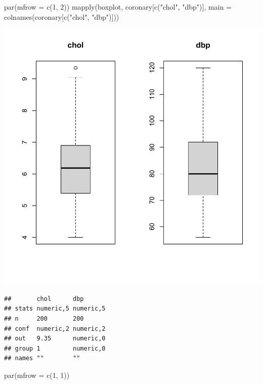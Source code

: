\documentclass[
]{book}
\makeatletter
\newenvironment{Shaded}{\begin{snugshade}}{\end{snugshade}}
\newcommand{\AttributeTok}[1]{\textcolor[rgb]{0.61,0.61,0.61}{#1}}
\newcommand{\DecValTok}[1]{\textcolor[rgb]{0.06,0.06,0.06}{#1}}
\newcommand{\FunctionTok}[1]{\textcolor[rgb]{0,0,0}{#1}}
\newcommand{\NormalTok}[1]{#1}
\newcommand{\StringTok}[1]{\textcolor[rgb]{0.5,0.5,0.5}{#1}}
\newenvironment{kframe}{%
\medskip{}
\setlength{\fboxsep}{.8em}
 \def\at@end@of@kframe{}%
 \ifinner\ifhmode%
  \def\at@end@of@kframe{\end{minipage}}%
  \begin{minipage}{\columnwidth}%
 \fi\fi%
 \def\FrameCommand##1{\hskip\@totalleftmargin \hskip-\fboxsep
 \colorbox{shadecolor}{##1}\hskip-\fboxsep
     \hskip-\linewidth \hskip-\@totalleftmargin \hskip\columnwidth}%
 \MakeFramed {\advance\hsize-\width
   \@totalleftmargin\z@ \linewidth\hsize
   \@setminipage}}%
 {\par\unskip\endMakeFramed%
 \at@end@of@kframe}
\renewenvironment{Shaded}{\begin{kframe}}{\end{kframe}}
\makeatother
\begin{document}
\begin{Shaded}
\begin{Highlighting}[]
\FunctionTok{par}\NormalTok{(}\AttributeTok{mfrow =} \FunctionTok{c}\NormalTok{(}\DecValTok{1}\NormalTok{, }\DecValTok{2}\NormalTok{))}
\FunctionTok{mapply}\NormalTok{(boxplot, coronary[}\FunctionTok{c}\NormalTok{(}\StringTok{"chol"}\NormalTok{, }\StringTok{"dbp"}\NormalTok{)], }
       \AttributeTok{main =} \FunctionTok{colnames}\NormalTok{(coronary[}\FunctionTok{c}\NormalTok{(}\StringTok{"chol"}\NormalTok{, }\StringTok{"dbp"}\NormalTok{)]))}
\end{Highlighting}
\end{Shaded}

\begin{center}\includegraphics[width=0.7\linewidth,keepaspectratio]{Multivariable_Data_Analysis_files/figure-latex/unnamed-chunk-102-2} \end{center}

\begin{verbatim}
##       chol      dbp      
## stats numeric,5 numeric,5
## n     200       200      
## conf  numeric,2 numeric,2
## out   9.35      numeric,0
## group 1         numeric,0
## names ""        ""
\end{verbatim}

\begin{Shaded}
\begin{Highlighting}[]
\FunctionTok{par}\NormalTok{(}\AttributeTok{mfrow =} \FunctionTok{c}\NormalTok{(}\DecValTok{1}\NormalTok{, }\DecValTok{1}\NormalTok{))}
\end{Highlighting}
\end{Shaded}
\end{document}
